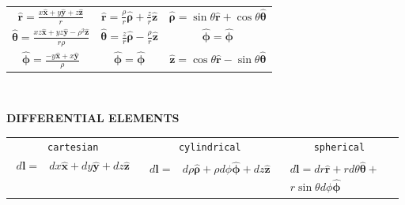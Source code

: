 \documentclass[letterpaper,landscape,10pt]{article}
\begin{document}
{\begin{multicols}{3}
\begin{center}
\begin{tabular}{ c c c }
		$ \bm{\hat{r}} = \frac{x\bm{\hat{x}} + y\bm{\hat{y}} +
			z\bm{\hat{z}}}{r} $ &
		$ \bm{\hat{r}} = \frac{\rho}{r}\bm{\hat{\rho}} + 
			\frac{z}{r}\bm{\hat{z}} $ &
		$ \bm{\hat{\rho}} = \sin\theta\bm{\hat{r}} +
			\cos\theta\bm{\hat{\theta}} $ \\

		$ \bm{\hat{\theta}} = \frac{xz\bm{\hat{x}} + yz\bm{\hat{y}} -
			\rho^2\bm{\hat{z}}} {r\rho} $ &
		$ \bm{\hat{\theta}} = \frac{z}{r}\bm{\hat{\rho}} -
			\frac{\rho}{r}\bm{\hat{z}} $ &
		$ \bm{\hat{\phi}} = \bm{\hat{\phi}} $ \\

		$ \bm{\hat{\phi}} = \frac{-y\bm{\hat{x}} + x\bm{\hat{y}}}{\rho} $ &
		$ \bm{\hat{\phi}} = \bm{\hat{\phi}} $ &
		$ \bm{\hat{z}} = \cos\theta\bm{\hat{r}} - \sin\theta\bm{\hat{\theta}}$\\
		
	\end{tabular}\\
	\end{center}
	
	\begin{center}
		\textbf{DIFFERENTIAL ELEMENTS}\\
		\begin{tabular}{ c  c  c }
			\texttt{cartesian} & \texttt{cylindrical} & \texttt{spherical} \\

			\vspace{-4pt}
			\parbox[t]{.9in}{\vspace{-10pt}
				\begin{equation*}\begin{split}
					d\bm{\mathbf{l}} =& dx\bm{\hat{x}} + dy\bm{\hat{y}} +
						dz\bm{\hat{z}}
				\end{split}\end{equation*} } &

			\parbox[t]{.9in}{\vspace{-10pt}
				\begin{equation*}\begin{split}
					d\bm{\mathbf{l}} =& d\rho\bm{\hat{\rho}} +
						\rho d\phi\bm{\hat{\phi}} + dz\bm{\hat{z}}
				\end{split}\end{equation*} } &

			\parbox[t]{.9in}{\vspace{-10pt}
				\begin{equation*}\begin{split}
					d\bm{\mathbf{l}} = dr\bm{\hat{r}} + rd\theta\bm{\hat{\theta}}
						+ & \\
						r\sin\theta d\phi\bm{\hat{\phi}}
				\end{split}\end{equation*} } \\


\end{tabular}
\end{center}
\end{multicols}}
\end{document}
